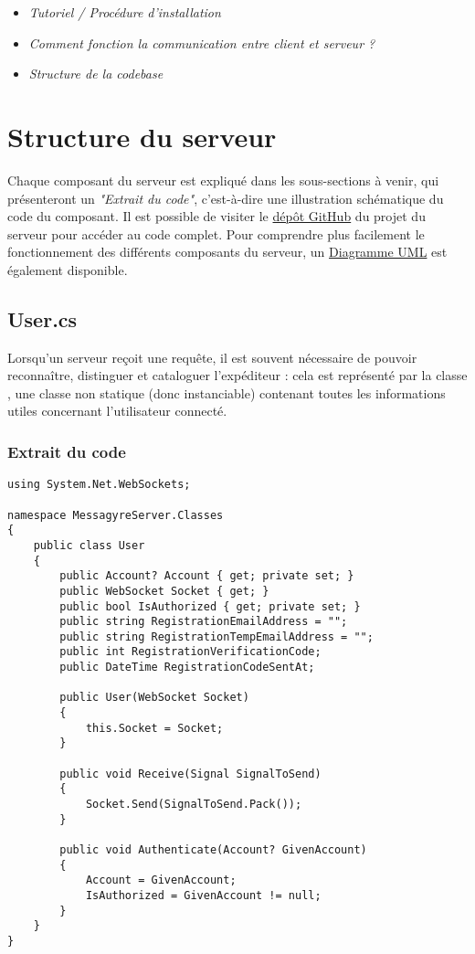\documentclass{article}
\begin{document}
\begin{itemize}
    \item \textit{\textit{Tutoriel / Procédure d'installation}}
    \item \textit{\textit{Comment fonction la communication entre client et serveur ?}}
    \item \textit{\textit{Structure de la codebase}}
\end{itemize}

\section{Structure du serveur}

Chaque composant du serveur est expliqué dans les sous-sections à venir, qui présenteront un \textit{"Extrait du code"}, c’est-à-dire une illustration schématique du code du composant. Il est possible de visiter le \href{https://github.com/Gravi32/MessagyreServer.git}{dépôt GitHub} du projet du serveur pour accéder au code complet.
Pour comprendre plus facilement le fonctionnement des différents composants du serveur, un \href{https://lucid.app/lucidchart/b8dadd52-61fd-468b-8bd6-a81aa133eb02/edit?viewport_loc=-3637\%2C-1769\%2C9681\%2C4831\%2C0_0&invitationId=inv_fa22bca5-082d-4666-b827-15f4adaa3a38}{Diagramme UML} est également disponible.

\subsection{User.cs}

Lorsqu’un serveur reçoit une requête, il est souvent nécessaire de pouvoir reconnaître, distinguer et cataloguer l’expéditeur : cela est représenté par la classe , une classe non statique (donc instanciable) contenant toutes les informations utiles concernant l’utilisateur connecté.

\subsubsection{Extrait du code}
\begin{verbatim}
using System.Net.WebSockets;

namespace MessagyreServer.Classes
{
    public class User
    {
        public Account? Account { get; private set; }
        public WebSocket Socket { get; }
        public bool IsAuthorized { get; private set; }
        public string RegistrationEmailAddress = "";
        public string RegistrationTempEmailAddress = "";
        public int RegistrationVerificationCode;
        public DateTime RegistrationCodeSentAt;
        
        public User(WebSocket Socket)
        {
            this.Socket = Socket;
        }

        public void Receive(Signal SignalToSend)
        {
            Socket.Send(SignalToSend.Pack());
        }

        public void Authenticate(Account? GivenAccount)
        {
            Account = GivenAccount;
            IsAuthorized = GivenAccount != null;
        }
    }
}
\end{verbatim}
\end{document}
